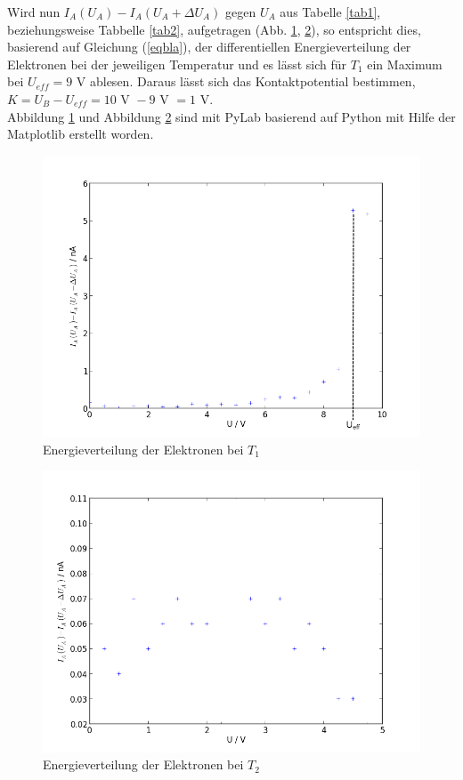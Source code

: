 Wird nun $I_A(U_A) - I_A(U_A+\Delta U_A)$ gegen $U_A$ aus Tabelle \ref{tab1}, beziehungsweise 
Tabbelle \ref{tab2}, aufgetragen (Abb. \ref{fig1}, \ref{fig2}),
so entspricht dies, basierend auf Gleichung (\ref{eqbla}), der differentiellen Energieverteilung der
Elektronen bei der jeweiligen Temperatur und es lässt sich für $T_1$ ein Maximum bei $U_{eff}=9$ V ablesen.
Daraus lässt sich das Kontaktpotential bestimmen, $K=U_B-U_{eff}=10\text{ V }-9\text{ V }=1$ V.\\

Abbildung \ref{fig1} und Abbildung \ref{fig2} sind mit PyLab basierend auf Python mit Hilfe der 
Matplotlib erstellt worden.

\begin{figure}[h]
	\centering
		\includegraphics[width=1.00\textwidth]{fig1.png}
		\caption{Energieverteilung der Elektronen bei $T_1$}
	\label{fig1}
\end{figure}

\begin{figure}[h]
	\centering
		\includegraphics[width=1.00\textwidth]{fig2.png}
		\caption{Energieverteilung der Elektronen bei $T_2$}
	\label{fig2}
\end{figure}

